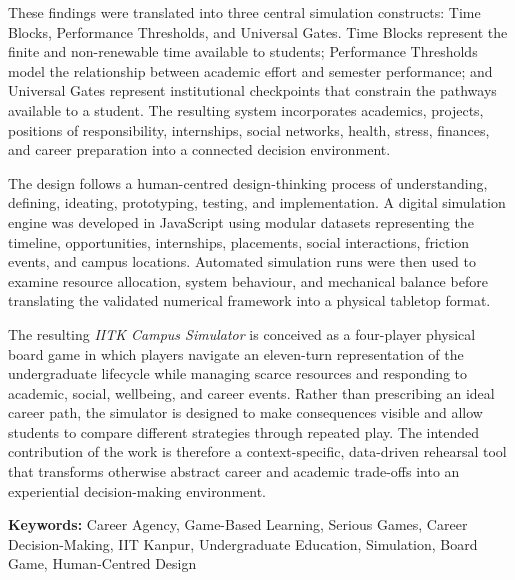\documentclass[12pt, a4paper, twoside, openright]{Thesis} %
\newcommand\myemptypage{
    \null
    \thispagestyle{empty}
    \addtocounter{page}{-1}
    \newpage
    }
\begin{document}
{These findings were translated into three central simulation constructs: Time Blocks, Performance Thresholds, and Universal Gates. Time Blocks represent the finite and non-renewable time available to students; Performance Thresholds model the relationship between academic effort and semester performance; and Universal Gates represent institutional checkpoints that constrain the pathways available to a student. The resulting system incorporates academics, projects, positions of responsibility, internships, social networks, health, stress, finances, and career preparation into a connected decision environment.

The design follows a human-centred design-thinking process of understanding, defining, ideating, prototyping, testing, and implementation. A digital simulation engine was developed in JavaScript using modular datasets representing the timeline, opportunities, internships, placements, social interactions, friction events, and campus locations. Automated simulation runs were then used to examine resource allocation, system behaviour, and mechanical balance before translating the validated numerical framework into a physical tabletop format.

The resulting \textit{IITK Campus Simulator} is conceived as a four-player physical board game in which players navigate an eleven-turn representation of the undergraduate lifecycle while managing scarce resources and responding to academic, social, wellbeing, and career events. Rather than prescribing an ideal career path, the simulator is designed to make consequences visible and allow students to compare different strategies through repeated play. The intended contribution of the work is therefore a context-specific, data-driven rehearsal tool that transforms otherwise abstract career and academic trade-offs into an experiential decision-making environment.

\vspace{1em}
\textbf{Keywords:} Career Agency, Game-Based Learning, Serious Games, Career Decision-Making, IIT Kanpur, Undergraduate Education, Simulation, Board Game, Human-Centred Design
}
\newpage
\myemptypage


\clearpage 
\myemptypage
\end{document}
